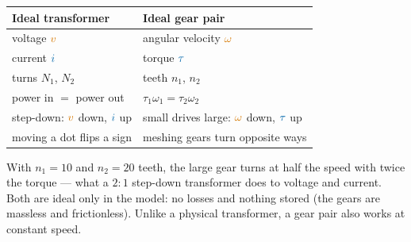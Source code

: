 \documentclass[11pt,a4paper]{article}
\newcommand{\Icol}[1]{\textcolor{ccur}{#1}}
\newcommand{\Vcol}[1]{\textcolor{cvolt}{#1}}
\newcommand{\gear}[5]{%
  \draw[metugray, thick, fill=gray!22, rotate around={#5:(#1,#2)}]
    plot[domain=0:360, samples=#4*24, variable=\t]
    ({#1+(#3+0.13*(sin(#4*\t)>0))*cos(\t)}, {#2+(#3+0.13*(sin(#4*\t)>0))*sin(\t)}) -- cycle;
  \fill[white] (#1,#2) circle (0.12); \draw[metugray] (#1,#2) circle (0.12);}
\begin{document}
\begin{center}
\begin{minipage}[c]{0.36\linewidth}
\centering
{}
\end{minipage}\hfill
\begin{minipage}[c]{0.62\linewidth}
\small
\begin{tabular}{@{}l l@{}}
\toprule
\textbf{Ideal transformer} & \textbf{Ideal gear pair}\\
\midrule
voltage $\Vcol{v}$ & angular velocity $\Vcol{\omega}$\\
current $\Icol{i}$ & torque $\Icol{\tau}$\\
turns $N_1$, $N_2$ & teeth $n_1$, $n_2$\\
power in $=$ power out & $\tau_1\omega_1 = \tau_2\omega_2$\\
step-down: $\Vcol{v}$ down, $\Icol{i}$ up & small drives large: $\Vcol{\omega}$ down, $\Icol{\tau}$ up\\
moving a dot flips a sign & meshing gears turn opposite ways\\
\bottomrule
\end{tabular}
\end{minipage}
\end{center}

With $n_1 = 10$ and $n_2 = 20$ teeth, the large gear turns at half the speed with twice the
torque --- what a $2:1$ step-down transformer does to voltage and current. Both are ideal
only in the model: no losses and nothing stored (the gears are massless and frictionless).
Unlike a physical transformer, a gear pair also works at constant speed.
\end{document}
